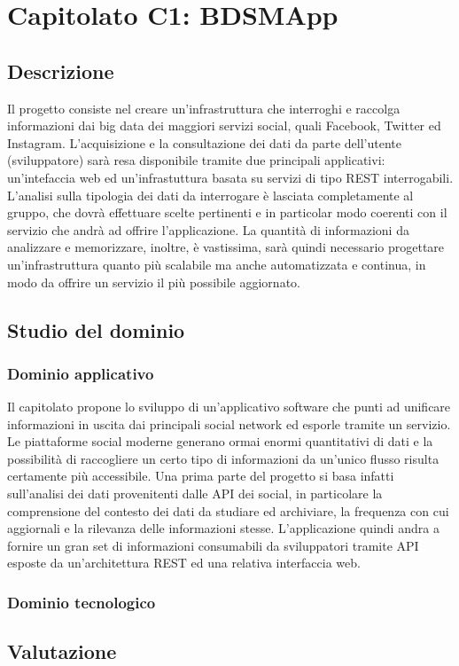 %


\section{Capitolato C1: BDSMApp}

\subsection{Descrizione}
Il progetto consiste nel creare un'infrastruttura che interroghi e raccolga informazioni dai big data dei maggiori servizi social, quali Facebook, Twitter ed Instagram. L'acquisizione e la consultazione dei dati da parte dell'utente (sviluppatore) sarà resa disponibile tramite due principali applicativi: un'intefaccia web ed un'infrastuttura basata su servizi di tipo REST interrogabili. L'analisi sulla tipologia dei dati da interrogare è lasciata completamente al gruppo, che dovrà effettuare scelte pertinenti e  in particolar modo coerenti con il servizio che andrà ad offrire l'applicazione. La quantità di informazioni da analizzare e memorizzare, inoltre, è vastissima, sarà quindi necessario progettare un'infrastruttura quanto più scalabile ma anche automatizzata e continua, in modo da offrire un servizio il più possibile aggiornato.

\subsection{Studio del dominio}
\subsubsection{Dominio applicativo}
Il capitolato propone lo sviluppo di un'applicativo software che punti ad unificare informazioni in uscita dai principali social network ed esporle tramite un servizio. Le piattaforme social moderne generano ormai enormi quantitativi di dati e la possibilità di raccogliere un certo tipo di informazioni da un'unico flusso risulta certamente più accessibile. Una prima parte del progetto si basa infatti sull'analisi dei dati provenitenti dalle API dei social, in particolare la comprensione del contesto dei dati da studiare ed archiviare, la frequenza con cui aggiornali e la rilevanza delle informazioni stesse.
L'applicazione quindi andra a fornire un gran set di informazioni consumabili da sviluppatori tramite API esposte da un'architettura REST ed una relativa interfaccia web. 

\subsubsection{Dominio tecnologico}

\subsection{Valutazione}